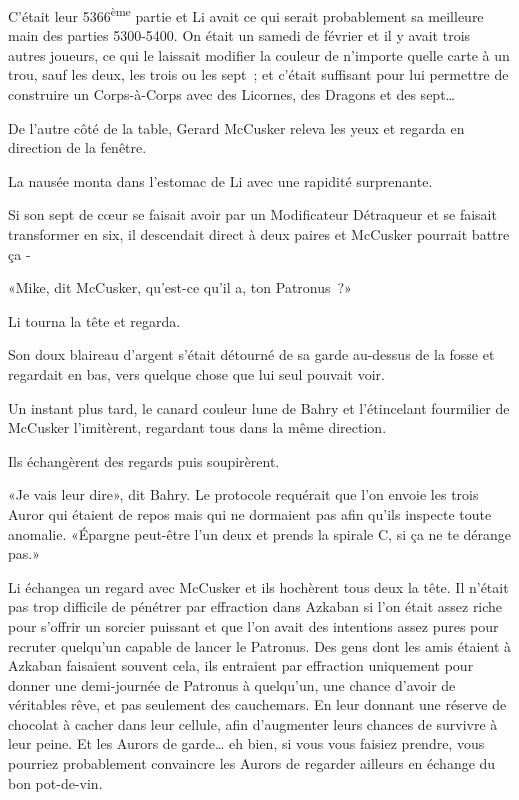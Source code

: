 C'était leur 5366\textsuperscript{ème} partie et Li avait ce qui serait probablement sa meilleure main des parties 5300-5400. On était un samedi de février et il y avait trois autres joueurs, ce qui le laissait modifier la couleur de n'importe quelle carte à un trou, sauf les deux, les trois ou les sept~; et c'était suffisant pour lui permettre de construire un Corps-à-Corps avec des Licornes, des Dragons et des sept…

De l'autre côté de la table, Gerard McCusker releva les yeux et regarda en direction de la fenêtre.

La nausée monta dans l'estomac de Li avec une rapidité surprenante.

Si son sept de cœur se faisait avoir par un Modificateur Détraqueur et se faisait transformer en six, il descendait direct à deux paires et McCusker pourrait battre ça -

«Mike, dit McCusker, qu'est-ce qu'il a, ton Patronus~?»

Li tourna la tête et regarda.

Son doux blaireau d'argent s'était détourné de sa garde au-dessus de la fosse et regardait en bas, vers quelque chose que lui seul pouvait voir.

Un instant plus tard, le canard couleur lune de Bahry et l'étincelant fourmilier de McCusker l'imitèrent, regardant tous dans la même direction.

Ils échangèrent des regards puis soupirèrent.

«Je vais leur dire», dit Bahry. Le protocole requérait que l'on envoie les trois Auror qui étaient de repos mais qui ne dormaient pas afin qu'ils inspecte toute anomalie. «Épargne peut-être l'un deux et prends la spirale C, si ça ne te dérange pas.»

Li échangea un regard avec McCusker et ils hochèrent tous deux la tête. Il n'était pas trop difficile de pénétrer par effraction dans Azkaban si l'on était assez riche pour s'offrir un sorcier puissant et que l'on avait des intentions assez pures pour recruter quelqu'un capable de lancer le Patronus. Des gens dont les amis étaient à Azkaban faisaient souvent cela, ils entraient par effraction uniquement pour donner une demi-journée de Patronus à quelqu'un, une chance d'avoir de véritables rêve, et pas seulement des cauchemars. En leur donnant une réserve de chocolat à cacher dans leur cellule, afin d'augmenter leurs chances de survivre à leur peine. Et les Aurors de garde… eh bien, si vous vous faisiez prendre, vous pourriez probablement convaincre les Aurors de regarder ailleurs en échange du bon pot-de-vin.

